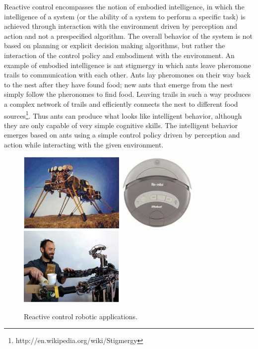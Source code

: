 \begin{itemize}
Reactive control encompasses the notion of embodied intelligence, in which the intelligence of a system (or the ability of a system to perform a specific task) is achieved through interaction with the environment driven by perception and action and not a prespecified algorithm. The overall behavior of the system is not based on planning or explicit decision making algorithms, but rather the interaction of the control policy and embodiment with the environment. An example of embodied intelligence is ant stigmergy in which ants leave pheromone trails to communication with each other. Ants lay pheromones on their way back to the nest after they have found food; new ants that emerge from the nest simply follow the pheronomes to find food. Leaving trails in such a way produces a complex network of trails and efficiently connects the nest to different food sources\footnote{http://en.wikipedia.org/wiki/Stigmergy}. Thus ants can produce what looks like intelligent behavior, although they are only capable of very simple cognitive skills. The intelligent behavior emerges based on ants using a simple control policy driven by perception and action while interacting with the given environment.

\begin{figure}[!h]
\centerline{
\mbox{\includegraphics[width=2.0in]{figures/5_ant.jpg}}
\mbox{\includegraphics[width=1.5in]{figures/5_roomba.jpg}}
\mbox{\includegraphics[width=2.0in]{figures/5_humanoid.jpg}}
}
\caption{Reactive control robotic applications.}
\label{fig:5_reactive_apps}
\end{figure}


\end{itemize}
